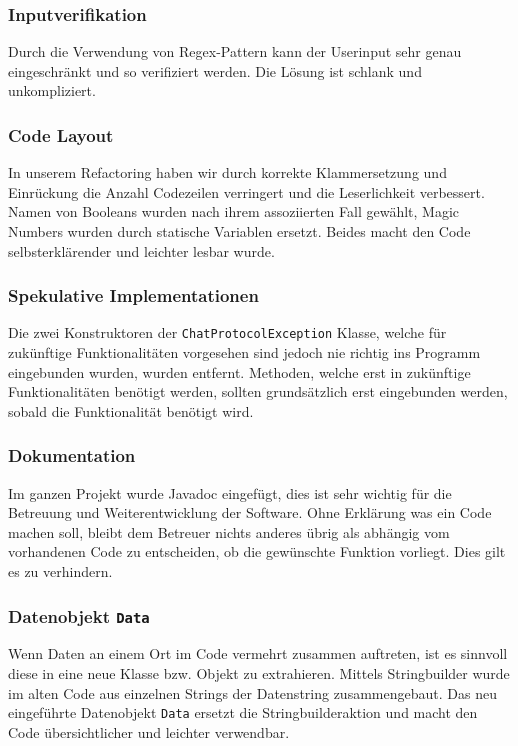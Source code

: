 \documentclass[10pt, hyperref, a4paper]{article}
\begin{document}
\subsubsection{Inputverifikation}
Durch die Verwendung von Regex-Pattern kann der Userinput sehr genau eingeschränkt und so verifiziert werden. Die Lösung ist schlank und unkompliziert.

\subsubsection{Code Layout}
In unserem Refactoring haben wir durch korrekte Klammersetzung und Einrückung die Anzahl Codezeilen verringert und die Leserlichkeit verbessert.
Namen von Booleans wurden nach ihrem assoziierten Fall gewählt, Magic Numbers wurden durch statische Variablen ersetzt. Beides macht den Code selbsterklärender und leichter lesbar wurde.

\subsubsection{Spekulative Implementationen}
Die zwei Konstruktoren der \texttt{ChatProtocolException} Klasse, welche für zukünftige Funktionalitäten vorgesehen sind jedoch nie richtig ins Programm eingebunden wurden, wurden entfernt. Methoden, welche erst in zukünftige Funktionalitäten benötigt werden, sollten grundsätzlich erst eingebunden werden, sobald die Funktionalität benötigt wird.

\subsubsection{Dokumentation}
Im ganzen Projekt wurde Javadoc eingefügt, dies ist sehr wichtig für die Betreuung und Weiterentwicklung der Software. Ohne Erklärung was ein Code machen soll, bleibt dem Betreuer nichts anderes übrig als abhängig vom vorhandenen Code zu entscheiden, ob die gewünschte Funktion vorliegt. Dies gilt es zu verhindern.

\subsubsection{Datenobjekt \texttt{Data}}
Wenn Daten an einem Ort im Code vermehrt zusammen auftreten, ist es sinnvoll diese in eine neue Klasse bzw. Objekt zu extrahieren. Mittels Stringbuilder wurde im alten Code aus einzelnen Strings der Datenstring zusammengebaut. Das neu eingeführte Datenobjekt \texttt{Data} ersetzt die Stringbuilderaktion und macht den Code übersichtlicher und leichter verwendbar.
\end{document}
